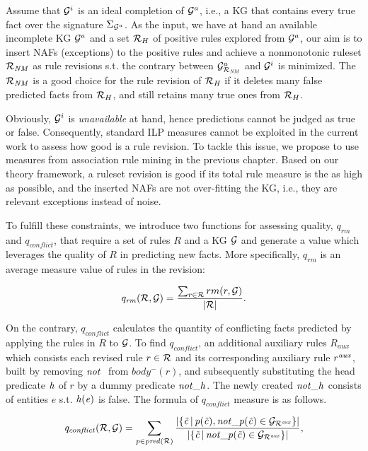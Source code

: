 Assume that $\mathcal{G}^i$ is an ideal completion of $\mathcal{G}^a$, i.e., a KG that contains every true fact over the signature $\Sigma_{\mathcal{G}^a}$. As the input, we have at hand an available incomplete KG $\mathcal{G}^a$ and a set $\mathcal{R}_H$ of positive rules explored from $\mathcal{G}^a$, our aim is to insert NAFs (exceptions) to the positive rules and achieve a nonmonotonic ruleset $\mathcal{R}_{\mathit{NM}}$ as rule revisions s.t. the contrary between $\mathcal{G}^a_{\mathcal{R}_{\mathit{NM}}}$ and $\mathcal{G}^i$ is minimized. The $\mathcal{R}_{\mathit{NM}}$ is a good choice for the rule revision of $\mathcal{R}_{\mathit{H}}$ if it deletes many false predicted facts from $\mathcal{R}_H$, and still retains many true ones from $\mathcal{R}_H$.

Obviously, $\mathcal{G}^i$ is \emph{unavailable} at hand, hence predictions cannot be judged as true or false. Consequently, standard ILP measures cannot be exploited in the current work to assess how good is a rule revision. To tackle this issue, we propose to use measures from association rule mining in the previous chapter. Based on our theory framework, a ruleset revision is good if its total rule measure is the as high as possible, and the inserted NAFs are not over-fitting the KG, i.e., they are relevant exceptions instead of noise.

To fulfill these constraints, we introduce two functions for assessing quality, $q_{rm}$ and $q_{conflict}$, that require a set of rules $R$ and a KG $\mathcal{G}$ and generate a value which leverages the quality of $R$ in predicting new facts. More specifically, $q_{rm}$ is an average measure value of rules in the revision:

\begin{equation}
q_{\mathit{rm}}(\mathcal{R},\mathcal{G})=\dfrac{\sum_{r\in \mathcal{R}}rm(r,\mathcal{G})}{|\mathcal{R}|}.
\end{equation}

On the contrary, $q_{conflict}$ calculates the quantity of conflicting facts predicted by applying the rules in $R$ to $\mathcal{G}$. To find $q_{conflict}$, an additional auxiliary rules $R_{aux}$ which consists each revised rule $r \in \mathcal{R}$ and its corresponding auxiliary rule $r^{\mathit{aux}}$, built by removing $\naf$ from $body^-(r)$, and subsequently substituting the head predicate $\mathit{h}$ of $r$ by a dummy predicate $\mathit{not\_h}$. The newly created $\mathit{not\_h}$ consists of entities $e$ s.t. $\mathit{h(e)}$ is false. The formula of $q_{conflict}$ measure is as follows.

\begin{equation}
\mathit{q_{conflict}(\mathcal{R},\mathcal{G})=\sum_{p\in pred(\mathcal{R})} \dfrac{|\{ \vec{c}\,|\,p(\vec{c}),not\_p(\vec{c})\in \mathcal{G}_{\mathcal{R}^{\mathit{aux}}}\} |}{|\{ \vec{c}\,|\,not\_p(\vec{c})\in \mathcal{G}_{\mathcal{R}^{\mathit{aux}}}\} |}}
\label{eq:conflict},
\end{equation}

